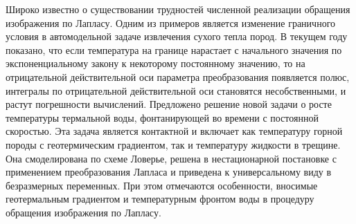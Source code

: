 Широко известно о существовании трудностей численной реализации обращения изображения по Лапласу. Одним из примеров является изменение граничного условия в автомодельной задаче извлечения сухого тепла пород.
В текущем году показано, что если температура на границе нарастает с начального значения по экспоненциальному закону к некоторому постоянному значению, то на отрицательной действительной оси параметра преобразования появляется полюс, интегралы по отрицательной действительной оси становятся несобственными, и растут погрешности вычислений. Предложено решение новой задачи о росте температуры термальной воды, фонтанирующей во времени с постоянной скоростью.
Эта задача является контактной и  включает как температуру горной породы с геотермическим градиентом, так и температуру жидкости в трещине. Она смоделирована по схеме Ловерье, решена в нестационарной постановке с применением преобразования Лапласа и приведена к универсальному виду в безразмерных переменных. При этом отмечаются особенности, вносимые геотермальным градиентом и температурным фронтом воды в процедуру обращения изображения по Лапласу.
